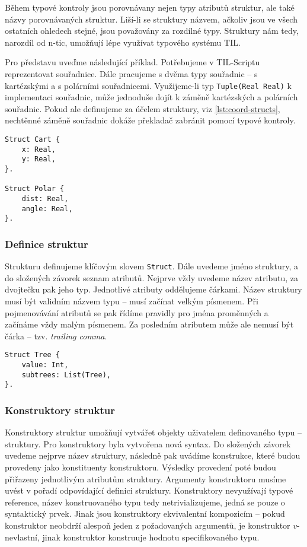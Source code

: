 Během typové kontroly jsou porovnávany nejen typy atributů struktur, ale také názvy porovnávaných
struktur. Liší-li se struktury názvem, ačkoliv jsou ve všech ostatních ohledech stejné, jsou
považovány za rozdílné typy. Struktury nám tedy, narozdíl od n-tic, umožňují lépe využívat typového
systému TIL.

Pro představu uveďme následující příklad. Potřebujeme v TIL-Scriptu reprezentovat souřadnice.
Dále pracujeme s dvěma typy souřadnic -- s kartézskými a s polárními souřadnicemi. Využijeme-li
typ \lstinline{Tuple(Real Real)} k implementaci souřadnic, může jednoduše dojít k záměně
kartézských a polárních souřadnic. Pokud ale definujeme za účelem struktury, viz
\ref{lst:coord-structs}, nechtěnné záměně souřadnic dokáže překladač zabránit pomocí typové kontroly.

\begin{lstlisting}[caption={Definice struktur reprezentujících souřadnice}, label=lst:coord-structs]
Struct Cart {
    x: Real,
    y: Real,
}.

Struct Polar {
    dist: Real,
    angle: Real,
}.
\end{lstlisting}

\subsubsection{Definice struktur}

Strukturu definujeme klíčovým slovem \lstinline{Struct}. Dále uvedeme jméno struktury, a do
složených závorek seznam atributů. Nejprve vždy uvedeme název atributu, za dvojtečku pak jeho typ.
Jednotlivé atributy oddělujeme čárkami. Název struktury musí být validním názvem typu -- musí
začínat velkým písmenem. Při pojmenovávání atributů se pak řídíme pravidly pro jména proměnných
a začínáme vždy malým písmenem. Za posledním atributem může ale nemusí být čárka -- tzv.
\textit{trailing comma}.

\begin{lstlisting}[caption={Příklad definice struktury}]
Struct Tree {
    value: Int,
    subtrees: List(Tree),
}.
\end{lstlisting}

\subsubsection{Konstruktory struktur}

Konstruktory struktur umožňují vytvářet objekty uživatelem definovaného typu -- struktury.
Pro konstruktory byla vytvořena nová syntax. Do složených závorek uvedeme nejprve název struktury,
následně pak uvádíme konstrukce, které budou provedeny jako konstituenty konstruktoru. Výsledky
provedení poté budou přiřazeny jednotlivým atributům struktury. Argumenty konstruktoru musíme uvést
v pořadí odpovídající definici struktury. Konstruktory nevyužívají typové reference, název
konstruovaného typu tedy netrivializujeme, jedná se pouze o syntaktický prvek. Jinak jsou
konstruktory ekvivalentní kompozicím -- pokud konstruktor neobdrží alespoň jeden z požadovaných
argumentů, je konstruktor $v$-nevlastní, jinak konstruktor konstruuje hodnotu specifikovaného typu.

